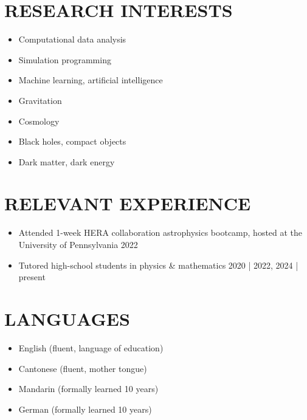 \documentclass[a4paper,10pt]{extarticle}
\begin{document}
\section*{RESEARCH INTERESTS}
\begin{itemize}
    \item Computational data analysis

    \item Simulation programming

    \item Machine learning, artificial intelligence
    
    \item Gravitation

    \item Cosmology

    \item Black holes, compact objects

    \item Dark matter, dark energy
\end{itemize}


\section*{RELEVANT EXPERIENCE}
\begin{itemize}
    \item Attended 1-week HERA collaboration astrophysics bootcamp, hosted at the University of Pennsylvania \hfill 2022

    \item Tutored high-school students in physics \& mathematics \hfill 2020 | 2022, 2024 | present
\end{itemize}


\section*{LANGUAGES}
\begin{itemize}
    \item English (fluent, language of education)

    \item Cantonese (fluent, mother tongue)

    \item Mandarin (formally learned 10 years)

    \item German (formally learned 10 years)
\end{itemize}
\end{document}
